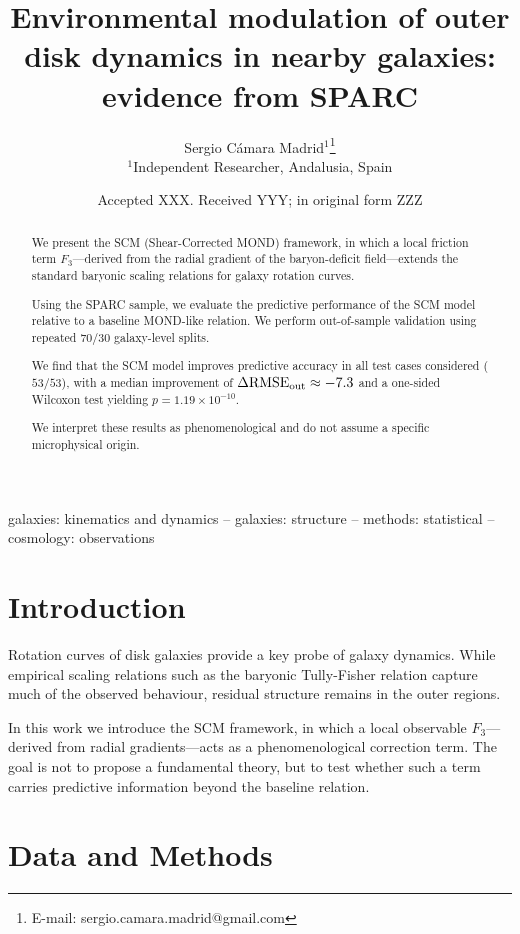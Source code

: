 \documentclass[fleqn,usenatbib]{mnras}
\title[SCM F3 and outer disk dynamics]{Environmental modulation of outer disk dynamics in nearby galaxies: evidence from SPARC}
\author[S. Cámara Madrid]{
Sergio Cámara Madrid$^{1}$\thanks{E-mail: sergio.camara.madrid@gmail.com} \\
$^{1}$Independent Researcher, Andalusia, Spain
}
\date{Accepted XXX. Received YYY; in original form ZZZ}
\begin{document}
\maketitle

\begin{abstract}
We present the SCM (Shear-Corrected MOND) framework, in which a local
friction term $F_3$---derived from the radial gradient of the
baryon-deficit field---extends the standard baryonic scaling relations
for galaxy rotation curves.

Using the SPARC sample, we evaluate the predictive performance of the
SCM model relative to a baseline MOND-like relation. We perform
out-of-sample validation using repeated 70/30 galaxy-level splits.

We find that the SCM model improves predictive accuracy in all test
cases considered ($53/53$), with a median improvement of
$\Delta\mathrm{RMSE}_{\rm out} \approx -7.3$ and a one-sided Wilcoxon
test yielding $p = 1.19\times10^{-10}$.

We interpret these results as phenomenological and do not assume a
specific microphysical origin.
\end{abstract}

\begin{keywords}
galaxies: kinematics and dynamics -- galaxies: structure -- methods: statistical -- cosmology: observations
\end{keywords}

\section{Introduction}
\label{sec:intro}

Rotation curves of disk galaxies provide a key probe of galaxy dynamics.
While empirical scaling relations such as the baryonic Tully-Fisher
relation capture much of the observed behaviour, residual structure
remains in the outer regions.

In this work we introduce the SCM framework, in which a local observable
$F_3$---derived from radial gradients---acts as a phenomenological
correction term. The goal is not to propose a fundamental theory, but
to test whether such a term carries predictive information beyond the
baseline relation.

\section{Data and Methods}
\label{sec:methods}
\end{document}
